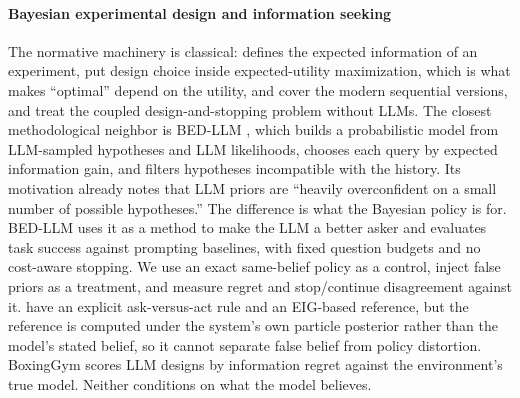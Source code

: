\documentclass[10pt,letterpaper,twocolumn]{article}
\begin{document}
\paragraph{Bayesian experimental design and information seeking}
The normative machinery is classical: \citet{lindley1956measure} defines the expected information of an experiment, \citet{chaloner1995bayesian} put design choice inside expected-utility maximization, which is what makes ``optimal'' depend on the utility, \citet{rainforth2024modern} and \citet{foster2021deep} cover the modern sequential versions, and \citet{cheng2025optimal} treat the coupled design-and-stopping problem without LLMs. The closest methodological neighbor is BED-LLM \citep{choudhury2026bedllm}, which builds a probabilistic model from LLM-sampled hypotheses and LLM likelihoods, chooses each query by expected information gain, and filters hypotheses incompatible with the history. Its motivation already notes that LLM priors are ``heavily overconfident on a small number of possible hypotheses.'' The difference is what the Bayesian policy is for. BED-LLM uses it as a method to make the LLM a better asker and evaluates task success against prompting baselines, with fixed question budgets and no cost-aware stopping. We use an exact same-belief policy as a control, inject false priors as a treatment, and measure regret and stop/continue disagreement against it. \citet{grand2026shoot} have an explicit ask-versus-act rule and an EIG-based reference, but the reference is computed under the system's own particle posterior rather than the model's stated belief, so it cannot separate false belief from policy distortion. BoxingGym \citep{gandhi2025boxinggym} scores LLM designs by information regret against the environment's true model. Neither conditions on what the model believes.
\end{document}
